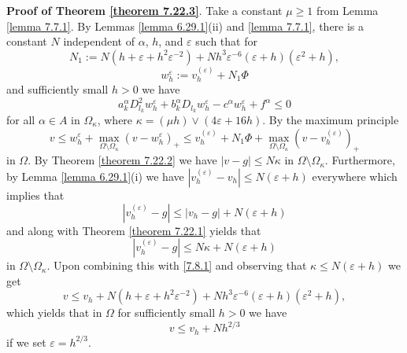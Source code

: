 \documentclass[11pt, reqno]{amsart}
\theoremstyle{definition}
\theoremstyle{remark}
\begin{document}
{\bf Proof of Theorem  \ref{theorem 7.22.3}}. Take
a constant $\mu\geq 1$ from Lemma \ref{lemma 7.7.1}.
By Lemmas \ref{lemma 6.29.1}(ii) and \ref{lemma 7.7.1}, 
there is a constant
$N$ independent of $\alpha$, $h$, and $\varepsilon$ 
such that for 
$$
N_{1}:= N(h+\varepsilon+h^{2}\varepsilon^{-2}) +N
h^{3}\varepsilon^{-6}(\varepsilon+h)(\varepsilon^{2}+h),
$$
$$
w^{\varepsilon}_{h}:=v^{(\varepsilon)}_{h}+N_{1}\Phi
$$
and sufficiently small $h>0$
we have
$$
 a_{k}^{\alpha}  D^{2}_{l_{k}}w^{\varepsilon}_{h}
+b_{k}^{\alpha} D _{l_{k}}w^{\varepsilon}_{h} 
-c^{\alpha}w^{\varepsilon}_{h}+f^{\alpha}  \leq0
$$
for all $\alpha\in A$ in $\Omega_{\kappa}$, where $\kappa=
(\mu h)\vee(4\varepsilon+16 h)$. By the maximum principle
\begin{equation}
                                                        \label{7.8.1}
v \leq w^{\varepsilon}_{h}
+\max_{\Omega\setminus\Omega_{\kappa}}(v-w^{\varepsilon}_{h})_{+}
\leq v_{h}^{(\varepsilon)}+N_{1}\Phi+
\max_{\Omega\setminus\Omega_{\kappa}}(v-v_{h}^{(\varepsilon)})_{+}
\end{equation}
in $\Omega$. By Theorem  \ref{theorem 7.22.2} we have
$|v-g|\leq N\kappa$ in $\Omega\setminus\Omega_{\kappa}$.
Furthermore, by  Lemma 
\ref{lemma 6.29.1}(i) we have $|v^{(\varepsilon)}_{h}-v_{h}|
\leq N( \varepsilon +h)$ everywhere which
implies that 
$$
|v^{(\varepsilon)}_{h}-g|\leq |v_{h}-g|
+N( \varepsilon +h)
$$
 and along with 
Theorem \ref{theorem 7.22.1} yields that
$$
|v^{(\varepsilon)}_{h}-g|\leq N\kappa 
+N( \varepsilon +h)
$$
 in $\Omega\setminus\Omega_{\kappa}$.
Upon combining this with \eqref{7.8.1} and observing that
$\kappa\leq N(\varepsilon+h)$ we get
$$
v  
\leq v_{h} + 
N(h+\varepsilon+h^{2}\varepsilon^{-2}) +N
h^{3}\varepsilon^{-6}(\varepsilon+h)(\varepsilon^{2}+h),
$$
 which yields that in $\Omega$ for sufficiently small $h>0$ we have
\begin{equation}
                                                        \label{7.8.03}
v  
\leq v_{h} + Nh^{2/3}
\end{equation}
if we set $\varepsilon=h^{2/3}$.
\end{document}
